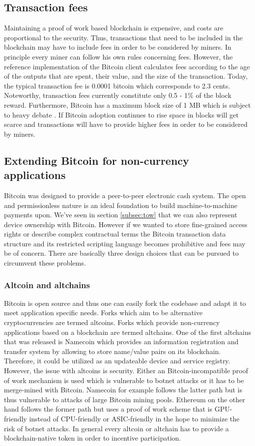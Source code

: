 \documentclass[10pt, conference,compsoc]{IEEEtran}
\begin{document}
\subsection{Transaction fees}
Maintaining a proof of work based blockchain is expensive, and costs are proportional to the security. Thus, transactions that need to be included in the blockchain may have to include fees in order to be considered by miners. In principle every miner can follow his own rules concerning fees. However, the reference implementation of the Bitcoin client calculates fees according to the age of the outputs that are spent, their value, and the size of the transaction. Today, the typical transaction fee is 0.0001 bitcoin which corresponds to 2.3 cents. Noteworthy, transaction fees currently constitute only 0.5 - 1\% of the block reward. Furthermore, Bitcoin has a maximum block size of 1 MB which is subject to heavy debate \cite{blocksize}. If Bitcoin adoption continues to rise space in blocks will get scarce and transactions will have to provide higher fees in order to be considered by miners. 

\subsection{Extending Bitcoin for non-currency applications}
Bitcoin was designed to provide a peer-to-peer electronic cash system. The open and permissionless nature is an ideal foundation to build machine-to-machine payments upon. We've seen in section \ref{subsec:tow} that we can also represent device ownership with Bitcoin. However if we wanted to store fine-grained access rights or describe complex contractual terms the Bitcoin transaction data structure and its restricted scripting language becomes prohibitive and fees may be of concern. There are basically three design choices that can be pursued to circumvent these problems.

\subsubsection*{Altcoin and altchains}
Bitcoin is open source and thus one can easily fork the codebase and adapt it to meet application specific needs. Forks which aim to be alternative cryptocurrencies are termed altcoins. Forks which provide non-currency applications based on a blockchain are termed altchains. One of the first altchains that was released is Namecoin \cite{namecoin} which provides an information registration and transfer system by allowing to store name/value pairs on its blockchain. Therefore, it could be utilized as an updateable device and service registry. However, the issue with altcoins is security. Either an Bitcoin-incompatible proof of work mechanism is used which is vulnerable to botnet attacks or it has to be merge-mined with Bitcoin. Namecoin for example follows the latter path but is thus vulnerable to attacks of large Bitcoin mining pools. Ethereum on the other hand follows the former path but uses a proof of work scheme that is GPU-friendly instead of CPU-friendly or ASIC-friendly in the hope to minimize the risk of botnet attacks. In general every altcoin or altchain has to provide a blockchain-native token in order to incentive participation.
\end{document}
